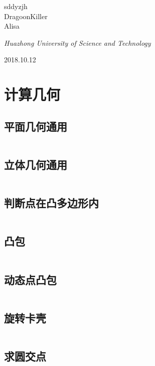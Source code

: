\documentclass[UTF8]{ctexart}
\begin{document}
\begin{titlepage}
	{\protect sddyzjh \\ DragoonKiller \\ Alisa \\} %
	
	\vspace{0.5\baselineskip} %
	
	\textit{Huazhong University of Science and Technology} %
	
	\vfill %
	
	
\date{\today}
	2018.10.12 %
	

\end{titlepage}
\setcounter{secnumdepth}{0}
\tableofcontents
\newpage
\section{计算几何}
\subsection{平面几何通用}
\inputminted{cpp}{calcgeometry/平面几何通用.cpp}
\subsection{立体几何通用}
\inputminted{cpp}{calcgeometry/立体几何通用.cpp}
\subsection{判断点在凸多边形内}
\inputminted{cpp}{calcgeometry/判断点在凸多边形内.cpp}
\subsection{凸包}
\inputminted{cpp}{calcgeometry/凸包.cpp}
\subsection{动态点凸包}
\inputminted{cpp}{calcgeometry/动态点凸包.cpp}
\subsection{旋转卡壳}
\inputminted{cpp}{calcgeometry/旋转卡壳.cpp}
\subsection{求圆交点}
\inputminted{cpp}{calcgeometry/求圆交点.cpp}
\end{document}
